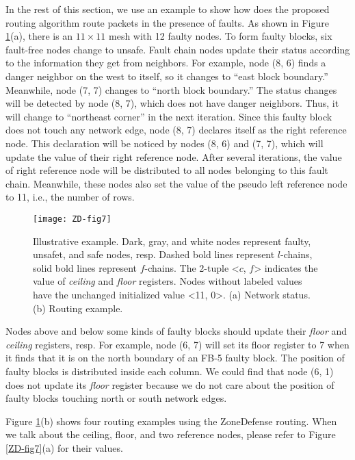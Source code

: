 In the rest of this section, we use an example to show how does the proposed routing algorithm route packets in the presence of faults. As shown in Figure \ref{fig:ZD-fig7}(a), there is an $11 \times 11$ mesh with 12 faulty nodes. To form faulty blocks, six fault-free nodes change to unsafe. Fault chain nodes update their status according to the information they get from neighbors. For example, node (8, 6) finds a danger neighbor on the west to itself, so it changes to “east block boundary.” Meanwhile, node (7, 7) changes to “north block boundary.” The status changes will be detected by node (8, 7), which does not have danger neighbors. Thus, it will change to “northeast corner” in the next iteration. Since this faulty block does not touch any network edge, node (8, 7) declares itself as the right reference node. This declaration will be noticed by nodes (8, 6) and (7, 7), which will update the value of their right reference node. After several iterations, the value of right reference node will be distributed to all nodes belonging to this fault chain. Meanwhile, these nodes also set the value of the pseudo left reference node to 11, i.e., the number of rows.
\begin{figure}[h]
    \centering
        \texttt{[image: ZD-fig7]}
          \caption{Illustrative example. Dark, gray, and white nodes represent faulty, unsafet, and safe nodes, resp. Dashed bold lines represent $l$-chains, solid bold lines represent $f$-chains. The 2-tuple <$c$, $f$> indicates the value of \textit{ceiling} and \textit{floor} registers. Nodes without labeled values have the unchanged initialized value <11, 0>. (a) Network status. (b) Routing example.}
        \label{fig:ZD-fig7}
\end{figure}


Nodes above and below some kinds of faulty blocks should update their \textit{floor} and \textit{ceiling} registers, resp. For example, node (6, 7) will set its floor register to 7 when it finds that it is on the north boundary of an FB-5 faulty block. The position of faulty blocks is distributed inside each column. We could find that node (6, 1) does not update its \textit{floor} register because we do not care about the position of faulty blocks touching north or south network edges.

Figure \ref{fig:ZD-fig7}(b) shows four routing examples using the ZoneDefense routing. When we talk about the ceiling, floor, and two reference nodes, please refer to Figure \ref{ZD-fig7}(a) for their values.

